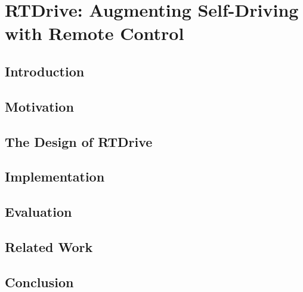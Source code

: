 


\chapter{RTDrive: Augmenting Self-Driving with Remote Control}


\section{Introduction}




\section{Motivation}




\section{The Design of RTDrive}





\section{Implementation}





\section{Evaluation}





\section{Related Work}




\section{Conclusion}



%


